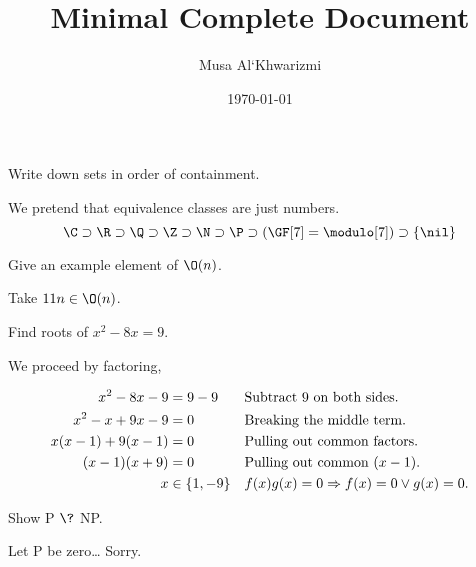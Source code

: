 \documentclass{homework}
\author{Musa Al`Khwarizmi}
\date{\today}
\title{Minimal Complete Document}
\begin{document}
\maketitle

\question Write down sets in order of containment.
\label{sec:org3263c5b}

We pretend that equivalence classes are just numbers.
\[
  \C \supset \R \supset \Q \supset \Z \supset \N \supset \P \supset (\GF[7] = \modulo[7]) \supset \{\nil\}
\]

\question Give an example element of \(\O(n)\).
\label{sec:org52fce46}

Take \(11n \in \O(n)\).

\question Find roots of \(x^2- 8x = 9\).
\label{sec:org7ebbf4a}

We proceed by factoring,

\begin{align*}
  x^2- 8x - 9         & = 9-9         &  & \text{Subtract 9 on both sides.}         \\
  x^2- x + 9x - 9     & = 0           &  & \text{Breaking the middle term.}         \\
  x(x - 1) + 9(x - 1) & = 0           &  & \text{Pulling out common factors.}       \\
  (x - 1)(x + 9)      & = 0           &  & \text{Pulling out common } (x - 1).      \\
  x                   & \in \{1, -9\} &  & f(x)g(x) = 0 \Rightarrow f(x) = 0 \vee g(x) = 0. \\
\end{align*}

\question Show P \(\?\) NP.
\label{sec:orgdfc5548}

Let P be zero\ldots{} Sorry.
\end{document}
